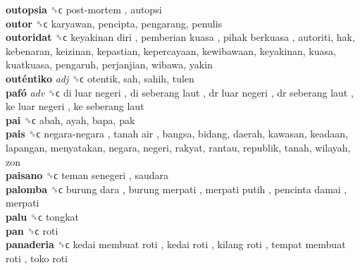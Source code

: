 \textbf{outopsia} ␝ϲ   post-mortem , autopsi  \\
\textbf{outor} ␝ϲ  karyawan, pencipta, pengarang, penulis  \\
\textbf{outoridat} ␝ϲ   keyakinan diri ,  pemberian kuasa ,  pihak berkuasa , autoriti, hak, kebenaran, keizinan, kepastian, kepercayaan, kewibawaan, keyakinan, kuasa, kuatkuasa, pengaruh, perjanjian, wibawa, yakin  \\
\textbf{outéntiko} \emph{adj}  ␝ϲ  otentik, sah, sahih, tulen  \\
\textbf{pafó} \emph{adv}  ␝ϲ   di luar negeri ,  di seberang laut ,  dr luar negeri ,  dr seberang laut ,  ke luar negeri ,  ke seberang laut   \\
\textbf{pai} ␝ϲ  abah, ayah, bapa, pak  \\
\textbf{pais} ␝ϲ   negara-negara ,  tanah air , bangsa, bidang, daerah, kawasan, keadaan, lapangan, menyatakan, negara, negeri, rakyat, rantau, republik, tanah, wilayah, zon  \\
\textbf{paisano} ␝ϲ   teman senegeri , saudara  \\
\textbf{palomba} ␝ϲ   burung dara ,  burung merpati ,  merpati putih ,  pencinta damai , merpati  \\
\textbf{palu} ␝ϲ  tongkat  \\
\textbf{pan} ␝ϲ  roti  \\
\textbf{panaderia} ␝ϲ   kedai membuat roti ,  kedai roti ,  kilang roti ,  tempat membuat roti ,  toko roti   \\
